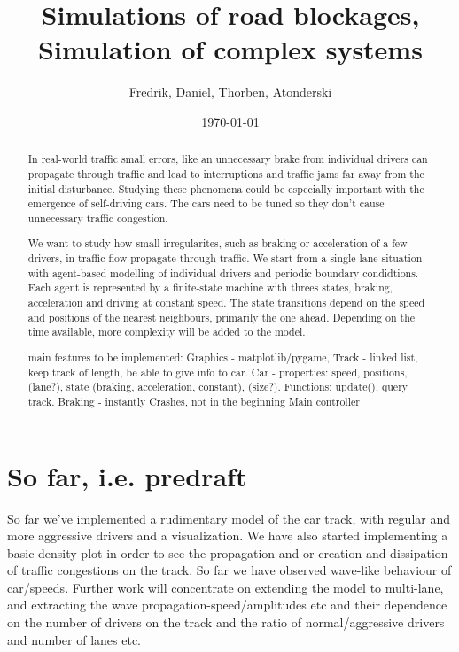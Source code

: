\documentclass[11pt,a4paper,twocolumn]{article}
\begin{document}
\title{Simulations of road blockages, Simulation of complex systems}
\author{Fredrik, Daniel, Thorben, Atonderski}
\date{\today}
\maketitle

\begin{abstract}
  In real-world traffic small errors, like an unnecessary brake from individual drivers can propagate through traffic and lead to interruptions and traffic jams far away from the initial disturbance. Studying these phenomena could be especially important with the emergence of self-driving cars. The cars need to be tuned so they don't cause unnecessary traffic congestion.

We want to study how small irregularites, such as braking or acceleration of a few drivers, in traffic flow propagate through traffic. We start from a single lane situation with agent-based modelling of individual drivers and periodic boundary condidtions. Each agent is represented by a finite-state machine with threes states, braking, acceleration and driving at constant speed. The state transitions depend on the speed and positions of the nearest neighbours, primarily the one ahead. Depending on the time available, more complexity will be added to the model.  

main features to be implemented:
Graphics - matplotlib/pygame,
Track - linked list, keep track of length, be able to give info to car.
Car - properties: speed, positions, (lane?), state (braking, acceleration, constant), (size?). Functions: update(), query track.
Braking - instantly
Crashes, not in the beginning
Main controller


\end{abstract}

\newpage
\tableofcontents

\section{So far, i.e. predraft}
So far we've implemented a rudimentary model of the car track, with regular and more aggressive drivers and a visualization. We have also started implementing a basic density plot in order to see the propagation and or creation and dissipation of traffic congestions on the track. So far we have observed wave-like behaviour of car/speeds. Further work will concentrate on extending the model to multi-lane, and extracting the wave propagation-speed/amplitudes etc and their dependence on the number of drivers on the track and the ratio of normal/aggressive drivers and number of lanes etc.
\end{document}
